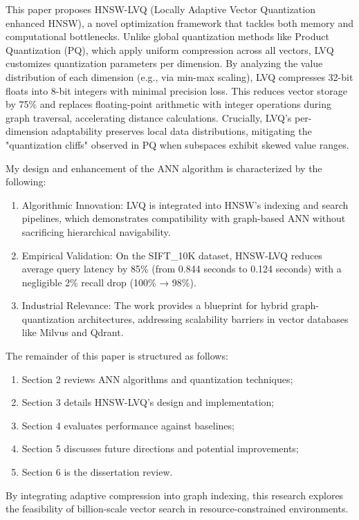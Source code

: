 \documentclass[sigconf, nonacm]{acmart}
\begin{document}
This paper proposes HNSW-LVQ (Locally Adaptive Vector Quantization enhanced HNSW), a novel optimization framework that tackles both memory and computational bottlenecks. Unlike global quantization methods like Product Quantization (PQ), which apply uniform compression across all vectors, LVQ customizes quantization parameters per dimension. By analyzing the value distribution of each dimension (e.g., via min-max scaling), LVQ compresses 32-bit floats into 8-bit integers with minimal precision loss. This reduces vector storage by 75\% and replaces floating-point arithmetic with integer operations during graph traversal, accelerating distance calculations. Crucially, LVQ’s per-dimension adaptability preserves local data distributions, mitigating the "quantization cliffs" observed in PQ when subspaces exhibit skewed value ranges.

My design and enhancement of the ANN algorithm is characterized by the following:

\begin{enumerate}
    \item Algorithmic Innovation: LVQ is integrated into HNSW’s indexing and search pipelines, which demonstrates compatibility with graph-based ANN without sacrificing hierarchical navigability.
    \item Empirical Validation: On the SIFT\_10K dataset, HNSW-LVQ reduces average query latency by 85\% (from 0.844 seconds to 0.124 seconds) with a negligible 2\% recall drop (100\% → 98\%).
    \item Industrial Relevance: The work provides a blueprint for hybrid graph-quantization architectures, addressing scalability barriers in vector databases like Milvus and Qdrant.
\end{enumerate}

The remainder of this paper is structured as follows: 
\begin{enumerate}
    \item Section 2 reviews ANN algorithms and quantization techniques;
    \item Section 3 details HNSW-LVQ’s design and implementation; 
    \item Section 4 evaluates performance against baselines;
    \item Section 5 discusses future directions and potential improvements;
    \item Section 6 is the dissertation review.
\end{enumerate}
By integrating adaptive compression into graph indexing, this research explores the feasibility of billion-scale vector search in resource-constrained environments.
 
\end{document}
